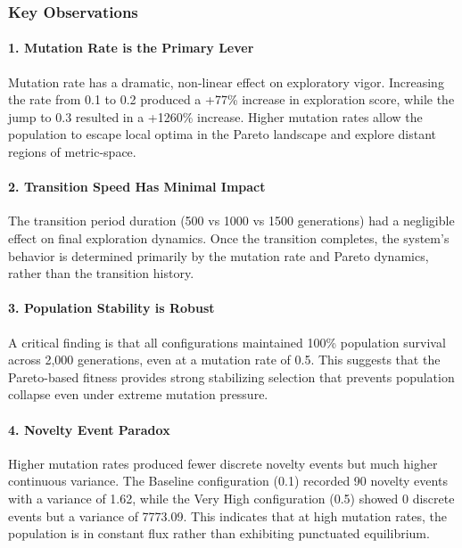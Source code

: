 \subsubsection{Key Observations}

\paragraph{1. Mutation Rate is the Primary Lever}
Mutation rate has a dramatic, non-linear effect on exploratory vigor. Increasing the rate from 0.1 to 0.2 produced a +77\% increase in exploration score, while the jump to 0.3 resulted in a +1260\% increase. Higher mutation rates allow the population to escape local optima in the Pareto landscape and explore distant regions of metric-space.

\paragraph{2. Transition Speed Has Minimal Impact}
The transition period duration (500 vs 1000 vs 1500 generations) had a negligible effect on final exploration dynamics. Once the transition completes, the system's behavior is determined primarily by the mutation rate and Pareto dynamics, rather than the transition history.

\paragraph{3. Population Stability is Robust}
A critical finding is that all configurations maintained 100\% population survival across 2,000 generations, even at a mutation rate of 0.5. This suggests that the Pareto-based fitness provides strong stabilizing selection that prevents population collapse even under extreme mutation pressure.

\paragraph{4. Novelty Event Paradox}
Higher mutation rates produced fewer discrete novelty events but much higher continuous variance. The Baseline configuration (0.1) recorded 90 novelty events with a variance of 1.62, while the Very High configuration (0.5) showed 0 discrete events but a variance of 7773.09. This indicates that at high mutation rates, the population is in constant flux rather than exhibiting punctuated equilibrium.
